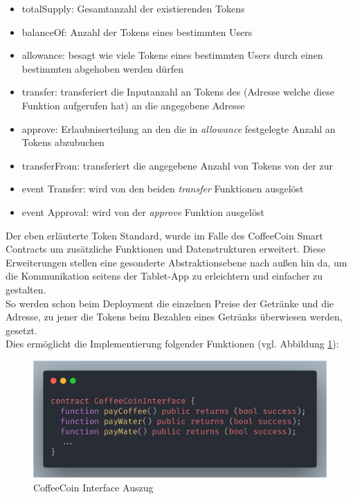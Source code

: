 \begin{itemize}
	\item totalSupply: Gesamtanzahl der existierenden Tokens
	\item balanceOf: Anzahl der Tokens eines bestimmten Users
	\item allowance: besagt wie viele Tokens eines bestimmten Users durch einen bestimmten  abgehoben werden dürfen
	\item transfer: transferiert die Inputanzahl an Tokens des  (Adresse welche diese Funktion aufgerufen hat) an die angegebene Adresse
	\item approve: Erlaubniserteilung an den  die in \textit{allowance} festgelegte Anzahl an Tokens abzubuchen
	\item transferFrom: transferiert die angegebene Anzahl von Tokens von der  zur 
	\item event Transfer: wird von den beiden \textit{transfer} Funktionen ausgelöst
	\item event Approval: wird von der \textit{approve} Funktion ausgelöst
\end{itemize}

Der eben erläuterte Token Standard, wurde im Falle des CoffeeCoin Smart Contracts um zusätzliche Funktionen und Datenstrukturen erweitert. Diese Erweiterungen stellen eine gesonderte Abstraktionsebene nach außen hin da, um die Kommunikation seitens der Tablet-App zu erleichtern und einfacher zu gestalten.\\
So werden schon beim Deployment die einzelnen Preise der Getränke und die Adresse, zu jener die Tokens beim Bezahlen eines Getränks überwiesen werden, gesetzt.\\
Dies ermöglicht die Implementierung folgender Funktionen (vgl. Abbildung \ref{img:cci}): 

\begin{figure}[th!]
	\centering
	\includegraphics[width=.9\columnwidth]{./Abbildungen/Kapitel_03/CCInterface.png}
	\caption{CoffeeCoin Interface Auszug}
	\label{img:cci}
\end{figure}

